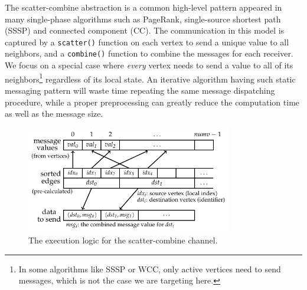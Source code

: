 \documentclass{sokendai_thesis} %
\begin{document}
The scatter-combine abstraction is a common high-level pattern appeared in many single-phase algorithms such as PageRank, single-source shortest path (SSSP) and connected component (CC).
The communication in this model is captured by a \texttt{scatter()} function on each vertex to send a unique value to all neighbors, and a \texttt{combine()} function to combine the messages for each receiver.
We focus on a special case where \textit{every} vertex needs to send a value to all of its neighbors\footnote{\small In some algorithms like SSSP or WCC, only active vertices need to send messages, which is not the case we are targeting here.} regardless of its local state.
An iterative algorithm having such static messaging pattern will waste time repeating the same message dispatching procedure, while a proper preprocessing can greatly reduce the computation time as well as the message size.


\begin{figure}[t]
 \centering
 \includegraphics[width=0.8\textwidth]{figures/scatter-impl.pdf}
 \caption{The execution logic for the scatter-combine channel.}%
 \label{fig:scatter-impl}
\end{figure}
\end{document}
